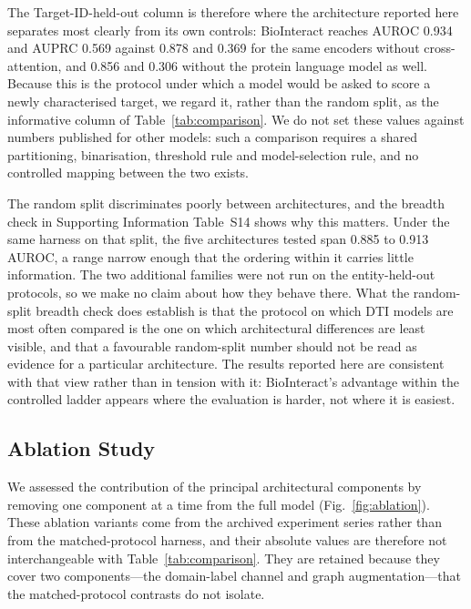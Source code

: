 \documentclass[fleqn,10pt]{wlscirep}
\begin{document}
The Target-ID-held-out column is therefore where the architecture reported here
separates most clearly from its own controls: BioInteract reaches AUROC 0.934
and AUPRC 0.569 against 0.878 and 0.369 for the same encoders without
cross-attention, and 0.856 and 0.306 without the protein language model as well.
Because this is the protocol under which a model would be asked to score a newly
characterised target, we regard it, rather than the random split, as the
informative column of Table~\ref{tab:comparison}.  We do not set these values
against numbers published for other models: such a comparison requires a shared
partitioning, binarisation, threshold rule and model-selection rule, and no
controlled mapping between the two exists.

The random split discriminates poorly between architectures, and the breadth
check in Supporting Information Table~S14 shows why this matters.  Under the
same harness on that split, the five architectures tested span 0.885 to 0.913
AUROC, a range narrow enough that the ordering within it carries little
information.  The two additional families were not run on the entity-held-out
protocols, so we make no claim about how they behave there.
What the random-split breadth check does establish is that the protocol on which
DTI models are most often compared is the one on which architectural differences
are least visible, and that a favourable random-split number should not be read
as evidence for a particular architecture.  The results reported here are
consistent with that view rather than in tension with it: BioInteract's
advantage within the controlled ladder appears where the evaluation is harder,
not where it is easiest.
\endgroup

\subsection{Ablation Study}
\label{sec:ablation}

We assessed the contribution of the principal architectural components by
removing one component at a time from the full model (Fig.~\ref{fig:ablation}).
\begingroup\color{red}
These ablation variants come from the archived experiment series rather than
from the matched-protocol harness, and their absolute values are therefore not
interchangeable with Table~\ref{tab:comparison}.  They are retained because
they cover two components---the domain-label channel and graph
augmentation---that the matched-protocol contrasts do not isolate.
\endgroup
\end{document}
